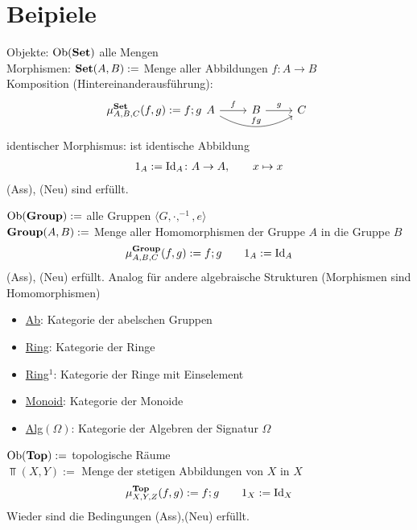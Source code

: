 \section*{Beipiele}
\begin{beispiel}%
	\label{def:set}
	Objekte: $\operatorname{Ob}(\operatorname{\mathbf{Set}})$ alle Mengen\\
	Morphismen: $\operatorname{\mathbf{Set}}(A,B):=$ Menge aller Abbildungen $f\colon A\to B$\\
	Komposition (Hintereinanderausführung):
	$$
		\mu_{A,B,C}^{\Set}(f,g):=f;g\\
		\begin{tikzcd}[ampersand replacement=\&]
			A \arrow{r}{f} \arrow[bend right]{rr}{fg} \& B \arrow{r}{g} \& C
	  	\end{tikzcd}
	$$
	identischer Morphismus: ist identische Abbildung
	\begin{align*}
		1_A:=\operatorname{Id}_A\colon A\to A,\qquad x\mapsto x
	\end{align*}
	(Ass), (Neu) sind erfüllt.
\end{beispiel}


\begin{beispiel}
	\label{def:group}
	$\operatorname{Ob}(\operatorname{\mathbf{Group}}):=$ alle Gruppen $\langle G,\cdot,^{-1},e\rangle$\\
	$\operatorname{\mathbf{Group}}(A,B):=$ Menge aller Homomorphismen der Gruppe $A$ in die Gruppe $B$
	\begin{align*}
		\mu_{A,B,C}^{\operatorname{\mathbf{Group}}}(f,g):=f;g\qquad 1_A:=\operatorname{Id}_A
	\end{align*}
	(Ass), (Neu) erfüllt.\nl
	Analog für andere algebraische Strukturen (Morphismen sind Homomorphismen)
	\begin{itemize}
		\item \ul{Ab}: Kategorie der abelschen Gruppen
		\item \ul{Ring}: Kategorie der Ringe
		\item \ul{Ring$^1$}: Kategorie der Ringe mit Einselement
		\item \ul{Monoid}: Kategorie der Monoide
		\item \ul{Alg$(\Omega)$}: Kategorie der Algebren der Signatur $\Omega$
	\end{itemize}
\end{beispiel}

\begin{beispiel}[$\Top$]\label{beisp1.5Top}\enter
	$\operatorname{Ob}(\operatorname{\mathbf{Top}}):=$ topologische Räume\\
	$\Top(X,Y):=$ Menge der stetigen Abbildungen von $X$ in $X$
	\begin{align*}
		\mu_{X,Y,Z}^{\operatorname{\mathbf{Top}}}(f,g):=f;g\qquad
		1_X:=\operatorname{Id}_X
	\end{align*}
	Wieder sind die Bedingungen (Ass),(Neu) erfüllt.
\end{beispiel}


